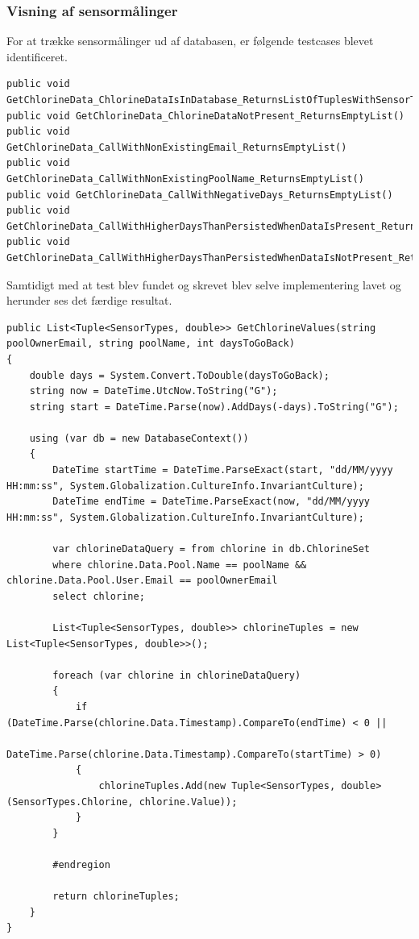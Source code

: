 \subsubsection{Visning af sensormålinger}

For at trække sensormålinger ud af databasen, er følgende testcases blevet identificeret.

\begin{lstlisting}[caption=Testcases til GetChlorineData metoden]
public void GetChlorineData_ChlorineDataIsInDatabase_ReturnsListOfTuplesWithSensorTypeAndValues()
public void GetChlorineData_ChlorineDataNotPresent_ReturnsEmptyList()
public void GetChlorineData_CallWithNonExistingEmail_ReturnsEmptyList()
public void GetChlorineData_CallWithNonExistingPoolName_ReturnsEmptyList()
public void GetChlorineData_CallWithNegativeDays_ReturnsEmptyList()
public void GetChlorineData_CallWithHigherDaysThanPersistedWhenDataIsPresent_ReturnsListWithOnlyDataPresent()
public void GetChlorineData_CallWithHigherDaysThanPersistedWhenDataIsNotPresent_ReturnsEmptyList()
\end{lstlisting}


Samtidigt med at test blev fundet og skrevet blev selve implementering lavet og herunder ses det færdige resultat.

\begin{lstlisting}[caption=Metoden GetChlorineValues]
public List<Tuple<SensorTypes, double>> GetChlorineValues(string poolOwnerEmail, string poolName, int daysToGoBack)
{
	double days = System.Convert.ToDouble(daysToGoBack);
	string now = DateTime.UtcNow.ToString("G");
	string start = DateTime.Parse(now).AddDays(-days).ToString("G");
	
	using (var db = new DatabaseContext())
	{
		DateTime startTime = DateTime.ParseExact(start, "dd/MM/yyyy HH:mm:ss", System.Globalization.CultureInfo.InvariantCulture);
		DateTime endTime = DateTime.ParseExact(now, "dd/MM/yyyy HH:mm:ss", System.Globalization.CultureInfo.InvariantCulture);
	
		var chlorineDataQuery = from chlorine in db.ChlorineSet
		where chlorine.Data.Pool.Name == poolName && chlorine.Data.Pool.User.Email == poolOwnerEmail
		select chlorine;
		
		List<Tuple<SensorTypes, double>> chlorineTuples = new List<Tuple<SensorTypes, double>>();
		
		foreach (var chlorine in chlorineDataQuery)
		{
			if (DateTime.Parse(chlorine.Data.Timestamp).CompareTo(endTime) < 0 ||
			DateTime.Parse(chlorine.Data.Timestamp).CompareTo(startTime) > 0)
			{
				chlorineTuples.Add(new Tuple<SensorTypes, double>(SensorTypes.Chlorine, chlorine.Value));
			}
		}
		
		#endregion
		
		return chlorineTuples;
	}
}
\end{lstlisting}





